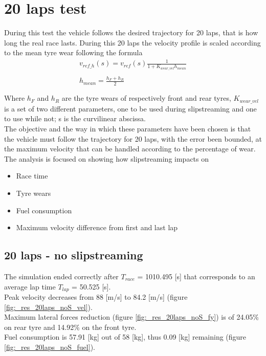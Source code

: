 \documentclass{report}
\let\Oldsection\section
\renewcommand{\section}{\FloatBarrier\Oldsection}
\let\Oldsubsection\subsection
\renewcommand{\subsection}{\FloatBarrier\Oldsubsection}
\begin{document}
\section{20 laps test}
During this test the vehicle follows the desired trajectory for 20 laps, that is how long the real race lasts. During this 20 laps the velocity profile is scaled according to the mean tyre wear following the formula
\begin{equation*}
\begin{aligned}
v_{ref\_h}(s) = v_{ref}(s) \frac{1}{1 + K_{wear\_vel}h_{mean}}\\\\
h_{mean} = \frac{h_F + h_R}{2}\\\\
\end{aligned}
\end{equation*}
Where $h_F$ and $h_R$ are the tyre wears of respectively front and rear tyres, $K_{wear\_vel}$ is a set of two different parameters, one to be used during slipstreaming and one to use while not; s is the curvilinear abscissa.
\\The objective and the way in which these parameters have been chosen is that the vehicle must follow the trajectory for 20 laps, with the error been bounded, at the maximum velocity that can be handled according to the percentage of wear.
\\The analysis is focused on showing how slipstreaming impacts on 
\begin{itemize}
    \item Race time
    \item Tyre wears
    \item Fuel consumption
    \item Maximum velocity difference from first and last lap
\end{itemize}

\subsection{20 laps - no slipstreaming}
The simulation ended correctly after $T_{race}$ = 1010.495 [s] that corresponds to an average lap time $T_{lap}$ = 50.525 [s].
\\Peak velocity decreases from 88 [m/s] to 84.2 [m/s] (figure \ref{fig:_res_20laps_noS_vel}).
\\Maximum lateral forces reduction (figure \ref{fig:_res_20laps_noS_fy}) is of 24.05\% on rear tyre and 14.92\% on the front tyre.
\\Fuel consumption is 57.91 [kg] out of 58 [kg], thus 0.09 [kg] remaining (figure \ref{fig:_res_20laps_noS_fuel}).
\end{document}
